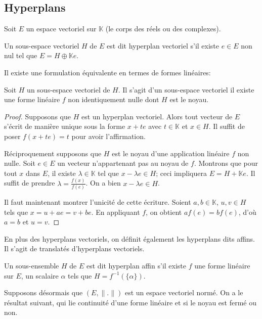 \subsection{Hyperplans}
Soit $E$ un espace vectoriel sur $\mathbb{K}$
(le corps des réels ou des complexes).

\begin{df}
  Un sous-espace vectoriel $H$ de $E$ est dit hyperplan
  vectoriel s'il existe $e\in E$ non nul tel que
  $E = H\oplus \mathbb{K}e$.
\end{df}

Il existe une formulation équivalente en termes de formes linéaires:
\begin{prop}
  Soit $H$ un sous-espace vectoriel de $H$.
  Il s'agit d'un sous-espace vectoriel \ssi{} il existe une
  forme linéaire $f$ non identiquement nulle dont $H$ est
  le noyau.
\end{prop}

\begin{proof}
  Supposons que $H$ est un hyperplan vectoriel. Alors tout
  vecteur de $E$ s'écrit de manière unique sous la forme
  $x + te$ avec $t\in\mathbb{K}$ et $x\in H$.
  Il suffit de poser $f(x + te) = t$ pour avoir l'affirmation.

  Réciproquement supposons que $H$ est le noyau d'une application
  linéaire $f$ non nulle. Soit $e\in E$ un vecteur n'appartenant pas
  au noyau de $f$. Montrons que pour tout $x$ dans $E$, il existe
  $\lambda\in\mathbb{K}$ tel que $x-\lambda e\in H$;
  ceci impliquera $E = H + \mathbb{K}e$. Il suffit de prendre
  $\lambda = \frac{f(x)}{f(e)}$. On a bien $x-\lambda e\in H$.

  Il faut maintenant montrer l'unicité de cette écriture. Soient
  $a, b\in\mathbb{K}$, $u, v \in H$ tels que $x = u + ae = v+be$.
  En appliquant $f$, on obtient $af(e) = bf(e)$, d'où $a = b$
  et $u = v$.
\end{proof}

En plus des hyperplans vectoriels, on définit également les
hyperplans dits affins. Il s'agit de translatés d'hyperplans
vectoriels.
\begin{df}
  Un sous-ensemble $H$ de $E$ est dit hyperplan affin s'il
  existe $f$ une forme linéaire sur $E$, un scalaire $\alpha$
  tels que $H = f^{-1}(\{\alpha\})$.
\end{df}

Supposons désormais que $(E, \|.\|)$ est un espace vectoriel
normé. On a le résultat suivant, qui lie continuité d'une
forme linéaire et si le noyau est fermé ou non.

